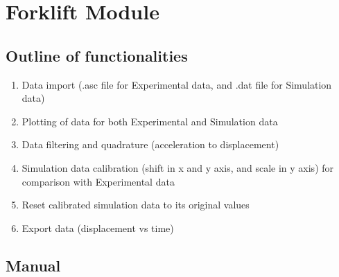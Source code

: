 \documentclass[12pt]{article}
\begin{document}
\section{Forklift Module}\label{Forklift}

\subsection{Outline of functionalities}

    \begin{enumerate}

        \item   Data import (.asc file for Experimental data, and .dat file for Simulation data)

        \item   Plotting of data for both Experimental and Simulation data

        \item   Data filtering and quadrature (acceleration to displacement)

        \item   Simulation data calibration (shift in x and y axis, and scale in y axis) for comparison with Experimental data

        \item   Reset calibrated simulation data to its original values

        \item   Export data (displacement vs time)

    \end{enumerate}

\subsection{Manual}
\end{document}
